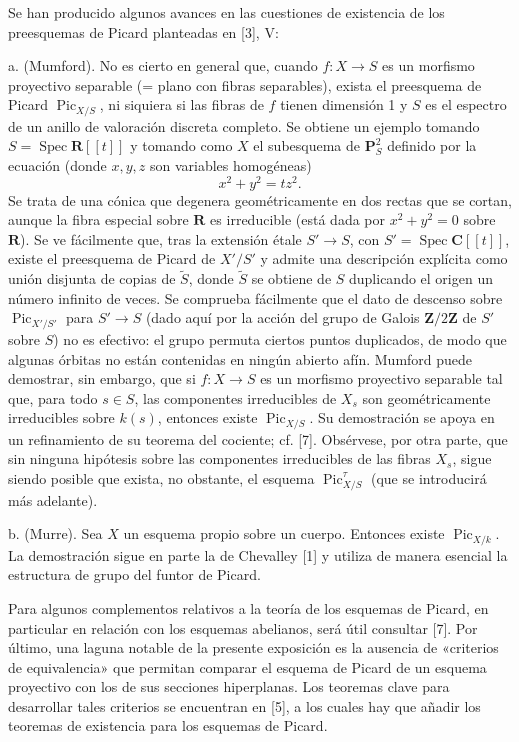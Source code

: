 \documentclass[11pt,twoside,openany]{book}
\numberwithin{equation}{section}
\newcommand{\src}[1]{%
  \phantomsection\hypertarget{src:#1}{}%
  \marginpar{\raggedleft\footnotesize\sffamily #1}%
}
\theoremstyle{plain}
\theoremstyle{definition}
\theoremstyle{remark}
\newcommand{\FgaUnitKey}{frontmatter}
\renewcommand{\src}[1]{%
  \phantomsection\hypertarget{src:\FgaUnitKey:#1}{}%
  \marginpar{\raggedleft\footnotesize\sffamily #1}%
}
\theoremstyle{plain}
\theoremstyle{definition}
\theoremstyle{remark}
\begin{document}
Se han producido algunos avances en las cuestiones de existencia de los
preesquemas de Picard planteadas en [3], V:

\medskip
\noindent a. (Mumford). No es cierto en general que, cuando
$f:X\longrightarrow S$ es un morfismo proyectivo separable (= plano con fibras
separables), exista el preesquema de Picard $\operatorname{Pic}_{X/S}$, ni
siquiera si las fibras de $f$ tienen dimensión 1 y $S$ es el espectro de un
anillo de valoración discreta completo. Se obtiene un ejemplo tomando
$S=\operatorname{Spec}\mathbf R[[t]]$ y tomando como $X$ el subesquema de
$\mathbf P^2_S$ definido por la ecuación (donde $x,y,z$ son variables
homogéneas)
\[
x^2+y^2=tz^2.
\]
Se trata de una cónica que degenera geométricamente en dos rectas que se
cortan, aunque la fibra especial sobre $\mathbf R$ es irreducible (está dada
por $x^2+y^2=0$ sobre $\mathbf R$). Se ve fácilmente que, tras la extensión
étale $S'\longrightarrow S$, con $S'=\operatorname{Spec}\mathbf C[[t]]$, existe
el preesquema de Picard de $X'/S'$ y admite una descripción explícita como
unión disjunta de copias de $\widetilde S$, donde $\widetilde S$ se obtiene de
$S$ duplicando el origen un número infinito de veces. Se comprueba fácilmente
que el dato de descenso sobre $\operatorname{Pic}_{X'/S'}$ para
$S'\longrightarrow S$ (dado aquí por la acción del grupo de Galois
$\mathbf Z/2\mathbf Z$ de $S'$ sobre $S$) no es efectivo: el grupo permuta
ciertos puntos duplicados, de modo que algunas órbitas no están contenidas en
ningún abierto afín. Mumford puede demostrar, sin embargo, que si
$f:X\longrightarrow S$ es un morfismo proyectivo separable tal que, para todo
$s\in S$, las componentes irreducibles de $X_s$ son geométricamente
irreducibles sobre $k(s)$, entonces existe $\operatorname{Pic}_{X/S}$. Su
demostración se apoya en un refinamiento de su teorema del cociente; cf. [7].
Obsérvese, por otra parte, que sin ninguna hipótesis sobre las componentes
irreducibles de las fibras $X_s$, sigue siendo posible que exista, no obstante,
el esquema $\operatorname{Pic}^{\tau}_{X/S}$ (que se introducirá más adelante).

\src{222}
\noindent b. (Murre). Sea $X$ un esquema propio sobre un cuerpo. Entonces
existe $\operatorname{Pic}_{X/k}$. La demostración sigue en parte la de
Chevalley [1] y utiliza de manera esencial la estructura de grupo del funtor de
Picard.

Para algunos complementos relativos a la teoría de los esquemas de Picard, en
particular en relación con los esquemas abelianos, será útil consultar [7]. Por
último, una laguna notable de la presente exposición es la ausencia de
«criterios de equivalencia» que permitan comparar el esquema de Picard de un
esquema proyectivo con los de sus secciones hiperplanas. Los teoremas clave
para desarrollar tales criterios se encuentran en [5], a los cuales hay que
añadir los teoremas de existencia para los esquemas de Picard.
\end{document}
